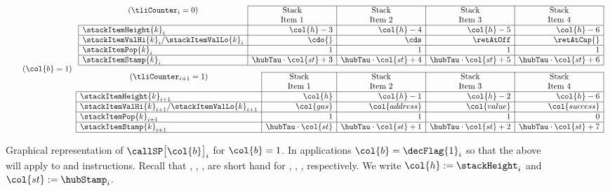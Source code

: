 \begin{figure}[h!]
\[
	\tag{$\col{b} = 1$}
	\begin{array}{r}
		\begin{array}{|l|r|r|r|r|}
		\cline{2-5}
		\multicolumn{1}{c|}{(\tliCounter_{i} = 0)} &
		\multicolumn{1}{c|}{\text{Stack}} &
		\multicolumn{1}{c|}{\text{Stack}} &
		\multicolumn{1}{c|}{\text{Stack}} &
		\multicolumn{1}{c|}{\text{Stack}} \\
		\multicolumn{1}{c|}{} &
		\multicolumn{1}{c|}{\text{Item 1}} &
		\multicolumn{1}{c|}{\text{Item 2}} &
		\multicolumn{1}{c|}{\text{Item 3}} &
		\multicolumn{1}{c|}{\text{Item 4}} \\ \hline
		\stackItemHeight{k}_{i} & \col{h} - 3 & \col{h} - 4 & \col{h} - 5 & \col{h} - 6 \\
		\hline
		\stackItemValHi{k}_{i}/\stackItemValLo{k}_{i} & \cdo{} & \cds & \retAtOff & \retAtCap{} \\
		\hline
		\stackItemPop{k}_{i} & 1 & 1 & 1 & 1 \\
		\hline
		\stackItemStamp{k}_{i} & \hubTau \cdot \col{st} + 3 & \hubTau \cdot \col{st} + 4 & \hubTau \cdot \col{st} + 5 & \hubTau \cdot \col{st} + 6 \\
		\hline
		\end{array} \vspace{3mm} \\
		\begin{array}{|l|r|r|r|r|}
		\cline{2-5}
		\multicolumn{1}{c|}{(\tliCounter_{i + 1} = 1)} &
		\multicolumn{1}{c|}{\text{Stack}} &
		\multicolumn{1}{c|}{\text{Stack}} &
		\multicolumn{1}{c|}{\text{Stack}} &
		\multicolumn{1}{c|}{\text{Stack}} \\
		\multicolumn{1}{c|}{} &
		\multicolumn{1}{c|}{\text{Item 1}} &
		\multicolumn{1}{c|}{\text{Item 2}} &
		\multicolumn{1}{c|}{\text{Item 3}} &
		\multicolumn{1}{c|}{\text{Item 4}} \\ \hline
		\stackItemHeight{k}_{i + 1} & \col{h} & \col{h} - 1 & \col{h} - 2 & \col{h} - 6 \\
		\hline 
		\stackItemValHi{k}_{i + 1}/\stackItemValLo{k}_{i + 1} & \col{gas} & \col{address} & \col{value} & \col{success} \\
		\hline
		\stackItemPop{k}_{i + 1} & 1 & 1 & 1 & 0 \\
		\hline
		\stackItemStamp{k}_{i + 1} & \hubTau \cdot \col{st} & \hubTau \cdot \col{st} + 1 & \hubTau \cdot \col{st} + 2 & \hubTau \cdot \col{st} + 7 \\
		\hline
		\end{array}
	\end{array}
\]
\label{fig: call stack pattern flag1 = 1}
\caption{%
Graphical representation of $\callSP\big[\col{b}\big]_{i}$ for $\col{b} = 1$.
In applications $\col{b} = \decFlag{1}_{i}$ so that the above will apply to  and  instructions.
Recall that \cdo{}, \retAtOff{}, \cds{}, \retAtCap{} are short hand for \CDO{}, \RETATOFF{}, \CDS{}, \RETATCAP{} respectively.
We write $\col{h} := \stackHeight_{i}$ and $\col{st} := \hubStamp_{i}$.}
\end{figure}
